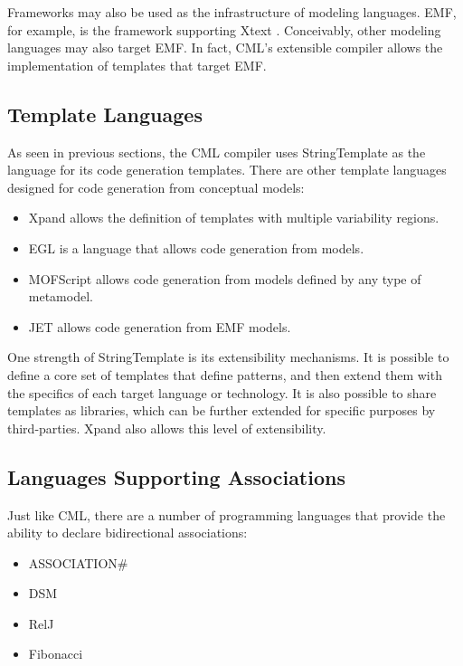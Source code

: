 Frameworks may also be used as the infrastructure of modeling languages.
EMF, for example, is the framework supporting Xtext \cite{xtext}.
Conceivably, other modeling languages may also target EMF.
In fact, CML's extensible compiler allows the implementation of templates that target EMF.

\subsection{Template Languages}

As seen in previous sections,
the CML compiler uses StringTemplate as the language for its code generation templates.
There are other template languages designed for code generation from conceptual models:

\begin{itemize}

\item Xpand \cite{xpand} allows the definition of templates with multiple variability regions.

\item EGL \cite{egl} is a language that allows code generation from models.

\item MOFScript \cite{mofscript} allows code generation from models defined
by any type of metamodel.

\item JET \cite{jet} allows code generation from EMF \cite{emf} models.

\end{itemize}

One strength of StringTemplate is its extensibility mechanisms.
It is possible to define a core set of templates that define patterns, 
and then extend them with the specifics of each target language or technology.
It is also possible to share templates as libraries,
which can be further extended for specific purposes by third-parties.
Xpand also allows this level of extensibility.

\subsection{Languages Supporting Associations}

Just like CML,
there are a number of programming languages that provide the ability to declare bidirectional associations:

\begin{itemize}

\item ASSOCIATION\# \cite{cardoso}

\item DSM \cite{balzer}

\item RelJ \cite{bierman}

\item Fibonacci \cite{fibonacci}

\end{itemize}

